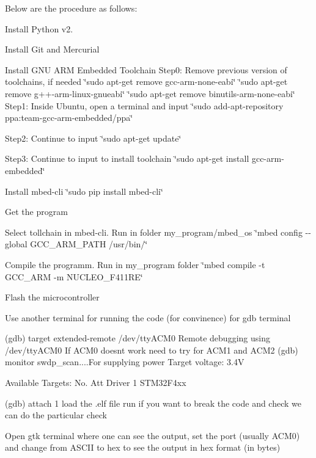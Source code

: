 Below are the procedure as follows\+:


\begin{DoxyEnumerate}
\item Install Python v2.
\item Install Git and Mercurial
\item Install G\+NU A\+RM Embedded Toolchain Step0\+: Remove previous version of toolchains, if needed \char`\"{}sudo apt-\/get remove gcc-\/arm-\/none-\/eabi\char`\"{} \char`\"{}sudo apt-\/get remove g++-\/arm-\/linux-\/gnueabi\char`\"{} \char`\"{}sudo apt-\/get remove binutils-\/arm-\/none-\/eabi\char`\"{} Step1\+: Inside Ubuntu, open a terminal and input \char`\"{}sudo add-\/apt-\/repository ppa\+:team-\/gcc-\/arm-\/embedded/ppa\char`\"{}
\end{DoxyEnumerate}

Step2\+: Continue to input \char`\"{}sudo apt-\/get update\char`\"{}

Step3\+: Continue to input to install toolchain \char`\"{}sudo apt-\/get install gcc-\/arm-\/embedded\char`\"{}
\begin{DoxyEnumerate}
\item Install mbed-\/cli \char`\"{}sudo pip install mbed-\/cli\char`\"{}
\item Get the program
\item Select tollchain in mbed-\/cli. Run in folder my\+\_\+program/mbed\+\_\+os \char`\"{}mbed config -\/-\/global G\+C\+C\+\_\+\+A\+R\+M\+\_\+\+P\+A\+T\+H /usr/bin/\char`\"{}
\item Compile the programm. Run in my\+\_\+program folder \char`\"{}mbed compile -\/t G\+C\+C\+\_\+\+A\+R\+M -\/m N\+U\+C\+L\+E\+O\+\_\+\+F411\+R\+E\char`\"{}
\item Flash the microcontroller
\end{DoxyEnumerate}

Use another terminal for running the code (for convinence) for gdb terminal

(gdb) target extended-\/remote /dev/tty\+A\+C\+M0 Remote debugging using /dev/tty\+A\+C\+M0 If A\+C\+M0 doesnt work need to try for A\+C\+M1 and A\+C\+M2 (gdb) monitor swdp\+\_\+scan....For supplying power Target voltage\+: 3.\+4V

Available Targets\+: No. Att Driver 1 S\+T\+M32\+F4xx

(gdb) attach 1 load the .elf file run if you want to break the code and check we can do the particular check

Open gtk terminal where one can see the output, set the port (usually A\+C\+M0) and change from A\+S\+C\+II to hex to see the output in hex format (in bytes)

